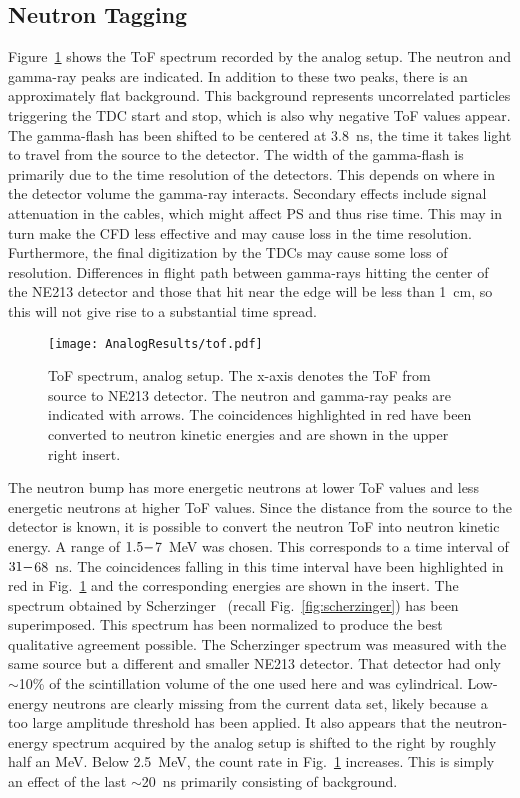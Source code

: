 \documentclass[main.tex]{subfiles}
\begin{document}
\subsection{Neutron Tagging}
Figure~\ref{fig:tof_a} shows the ToF spectrum recorded by the analog setup. The neutron and gamma-ray peaks are indicated. In addition to these two peaks, there is an approximately flat background. This background represents uncorrelated particles triggering the TDC start and stop, which is also why negative ToF values appear.
The gamma-flash has been shifted to be centered at \SI{3.8}{ns}, the time it takes light to travel from the source to the detector. The width of the gamma-flash is primarily due to the time resolution of the detectors. This depends on where in the detector volume the gamma-ray interacts. Secondary effects include signal attenuation in the cables, which might affect PS and thus rise time. This may in turn make the CFD less effective and may cause loss in the time resolution. Furthermore, the final  digitization by the TDCs may cause some loss of resolution. Differences in flight path between gamma-rays hitting the center of the NE213 detector and those that hit near the edge will be less than \SI{1}{cm}, so this will not give rise to a substantial time spread. 
\begin{figure}[ht]
    \centering
        \texttt{[image: AnalogResults/tof.pdf]}
        \caption[ToF spectrum, analog setup.]{ToF spectrum, analog setup. The x-axis denotes the ToF from source to NE213 detector. The neutron and gamma-ray peaks are indicated with arrows. The coincidences highlighted in red have been converted to neutron kinetic energies and are shown in the upper right insert.}
    \label{fig:tof_a}
\end{figure}
The neutron bump has more energetic neutrons at lower ToF values and less energetic neutrons at higher ToF values. Since the distance from the source to the detector is known, it is possible to convert the neutron ToF into neutron kinetic energy. A range of $1.5\--$7~\si{\MeV} was chosen. This corresponds to a time interval of $31\--$\SI{68}{\ns}. The coincidences falling in this time interval have been highlighted in red in Fig.~\ref{fig:tof_a} and the corresponding energies are shown in the insert. The spectrum obtained by Scherzinger~\cite{ScherzingerPhd} (recall Fig.~\ref{fig:scherzinger}) has been superimposed. This spectrum has been normalized to produce the best qualitative agreement possible. The Scherzinger spectrum was measured with the same source but a different and smaller NE213 detector. That detector had only $\sim$10\% of the scintillation volume of the one used here and was cylindrical. 
Low-energy neutrons are clearly missing from the current data set, likely because a too large amplitude threshold has been applied. 
It also appears that the neutron-energy spectrum acquired by the analog setup is shifted to the right by roughly half an MeV. Below \SI{2.5}{MeV}, the count rate in Fig.~\ref{fig:tof_a} increases. This is simply an effect of the last $\sim$\SI{20}{\ns} primarily consisting of background.
\end{document}
